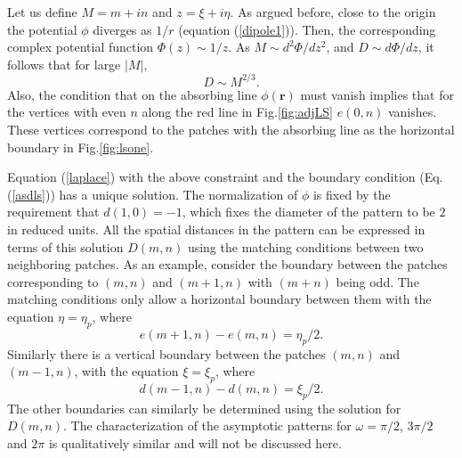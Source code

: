 \documentclass[11pt,a4paper]{book}
\begin{document}
Let us define $M=m+in$ and $z=\xi+i\eta$. As argued before, close to the origin the potential $\phi$ diverges as
$1/r$ (equation (\ref{dipole1})). Then, the corresponding complex potential function
$\Phi\left( z \right) \sim 1/z$. As $M \sim {d^2 \Phi}/{dz^2} $, and
$D \sim d \Phi /dz$,  it follows that for large $|M|$,
\begin{equation}
D \sim M^{2/3}.
\label{asdls}
\end{equation}
Also, the condition that on the absorbing line $\phi\left( \mathbf{r} \right)$ must vanish implies that for the vertices
with even $n$ along the red line in Fig.\ref{fig:adjLS} $e(0,n)$ vanishes. These
vertices correspond to the patches with the absorbing line as the horizontal boundary in Fig.\ref{fig:lsone}.


Equation (\ref{laplace}) with the above constraint and the boundary condition (Eq.(\ref{asdls}))
has a unique solution. The normalization of $\phi$ is fixed by the requirement that
$d(1,0)=-1$, which fixes the diameter of the pattern to be $2$ in reduced units. All the
spatial distances in the pattern can be expressed in terms of this solution $D\left( m, n \right)$
using the matching conditions between two neighboring patches. As an example, consider
the boundary between the patches corresponding to $\left( m, n \right)$ and $\left( m+1, n \right)$
with $\left( m+n \right)$ being odd. The matching conditions only allow a horizontal boundary
between them with the equation $\eta=\eta_{p}$, where
\begin{equation}
e\left( m+1, n \right) - e\left( m, n \right)=\eta_{p}/2.
\end{equation}
Similarly there is a vertical boundary between the patches $\left( m, n \right)$ and $\left( m-1, n \right)$,
with the equation $\xi=\xi_{p}$, where
\begin{equation}
d\left( m-1, n \right) - d\left( m, n \right)=\xi_{p}/2.
\end{equation}
The other boundaries can similarly be determined using the solution for $D\left( m, n \right)$.
The characterization of the asymptotic patterns for $\omega=\pi/2$, $3\pi/2$ and $2\pi$ is qualitatively similar and
will not be discussed here.
\end{document}
